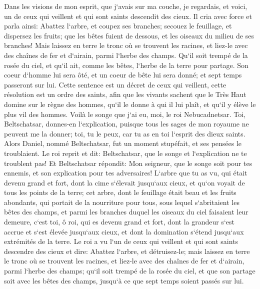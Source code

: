 \verse Dans les visions de mon esprit, que j`avais sur ma couche, je regardais, et voici, un de ceux qui veillent et qui sont saints descendit des cieux. 
\verse Il cria avec force et parla ainsi: Abattez l`arbre, et coupez ses branches; secouez le feuillage, et dispersez les fruits; que les bêtes fuient de dessous, et les oiseaux du milieu de ses branches! 
\verse Mais laissez en terre le tronc où se trouvent les racines, et liez-le avec des chaînes de fer et d`airain, parmi l`herbe des champs. Qu`il soit trempé de la rosée du ciel, et qu`il ait, comme les bêtes, l`herbe de la terre pour partage. 
\verse Son coeur d`homme lui sera ôté, et un coeur de bête lui sera donné; et sept temps passeront sur lui. 
\verse Cette sentence est un décret de ceux qui veillent, cette résolution est un ordre des saints, afin que les vivants sachent que le Très Haut domine sur le règne des hommes, qu`il le donne à qui il lui plaît, et qu`il y élève le plus vil des hommes. 
\verse Voilà le songe que j`ai eu, moi, le roi Nebucadnetsar. Toi, Beltschatsar, donnes-en l`explication, puisque tous les sages de mon royaume ne peuvent me la donner; toi, tu le peux, car tu as en toi l`esprit des dieux saints. 
\verse Alors Daniel, nommé Beltschatsar, fut un moment stupéfait, et ses pensées le troublaient. Le roi reprit et dit: Beltschatsar, que le songe et l`explication ne te troublent pas! Et Beltschatsar répondit: Mon seigneur, que le songe soit pour tes ennemis, et son explication pour tes adversaires! 
\verse L`arbre que tu as vu, qui était devenu grand et fort, dont la cime s`élevait jusqu`aux cieux, et qu`on voyait de tous les points de la terre; 
\verse cet arbre, dont le feuillage était beau et les fruits abondants, qui portait de la nourriture pour tous, sous lequel s`abritaient les bêtes des champs, et parmi les branches duquel les oiseaux du ciel faisaient leur demeure, 
\verse c`est toi, ô roi, qui es devenu grand et fort, dont la grandeur s`est accrue et s`est élevée jusqu`aux cieux, et dont la domination s`étend jusqu`aux extrémités de la terre. 
\verse Le roi a vu l`un de ceux qui veillent et qui sont saints descendre des cieux et dire: Abattez l`arbre, et détruisez-le; mais laissez en terre le tronc où se trouvent les racines, et liez-le avec des chaînes de fer et d`airain, parmi l`herbe des champs; qu`il soit trempé de la rosée du ciel, et que son partage soit avec les bêtes des champs, jusqu`à ce que sept temps soient passés sur lui. 
